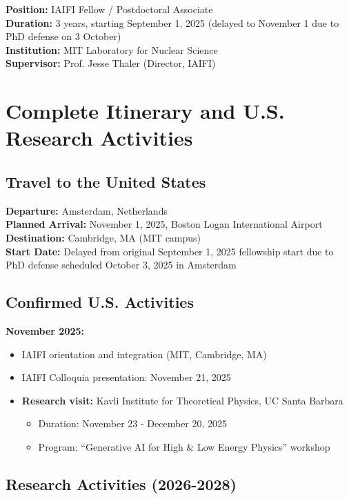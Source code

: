 \documentclass[11pt]{article}
\newcommand{\includepdfwithheader}[2][]{
    
}
\newcommand{\currentsection}{}
\newcommand{\sectionwithheader}[1]{
    \section{#1}
    \renewcommand{\currentsection}{\thesection. #1}
}
\begin{document}
\textbf{Position:} IAIFI Fellow / Postdoctoral Associate\\
\textbf{Duration:} 3 years, starting September 1, 2025 (delayed to November 1 due to PhD defense on 3 October) \\
\textbf{Institution:} MIT Laboratory for Nuclear Science\\
\textbf{Supervisor:} Prof. Jesse Thaler (Director, IAIFI)

\includepdfwithheader[pages=-]{offer-cover-letter.pdf}

\newpage

\sectionwithheader{Complete Itinerary and U.S. Research Activities}

\subsection*{Travel to the United States}
\textbf{Departure:} Amsterdam, Netherlands\\
\textbf{Planned Arrival:} November 1, 2025, Boston Logan International Airport\\
\textbf{Destination:} Cambridge, MA (MIT campus)\\
\textbf{Start Date:} Delayed from original September 1, 2025 fellowship start due to PhD defense scheduled October 3, 2025 in Amsterdam

\subsection*{Confirmed U.S. Activities}

\textbf{November 2025:}
\begin{itemize}[noitemsep]
\item IAIFI orientation and integration (MIT, Cambridge, MA)
\item IAIFI Colloquia presentation: November 21, 2025
\item \textbf{Research visit:} Kavli Institute for Theoretical Physics, UC Santa Barbara
\begin{itemize}
    \item Duration: November 23 - December 20, 2025
    \item Program: ``Generative AI for High \& Low Energy Physics'' workshop
\end{itemize}
\end{itemize}

\subsection*{Research Activities (2026-2028)}
\end{document}
